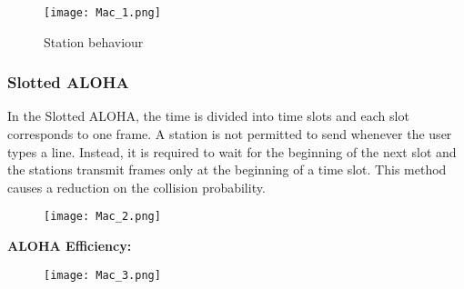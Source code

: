 \documentclass[../resumosRCOM.tex]{subfiles}
\begin{document}
\begin{figure}[H]
    \centering
    \texttt{[image: Mac\_1.png]}
    \caption{Station behaviour}
\end{figure}
\newline
\newline
\subsubsection{Slotted ALOHA}
In the Slotted ALOHA, the time is divided into time slots and each slot corresponds to one frame.
\newline
A station is not permitted to send whenever the user types a line. Instead, it is required to wait for the beginning of the next slot and the stations transmit frames only at the beginning of a time slot.
\newline
This method causes a reduction on the collision probability.

\begin{figure}[H]
    \centering
    \texttt{[image: Mac\_2.png]}
\end{figure}
\textbf{ALOHA Efficiency:}
\begin{figure}[H]
    \centering
    \texttt{[image: Mac\_3.png]}
\end{figure}
\end{document}
